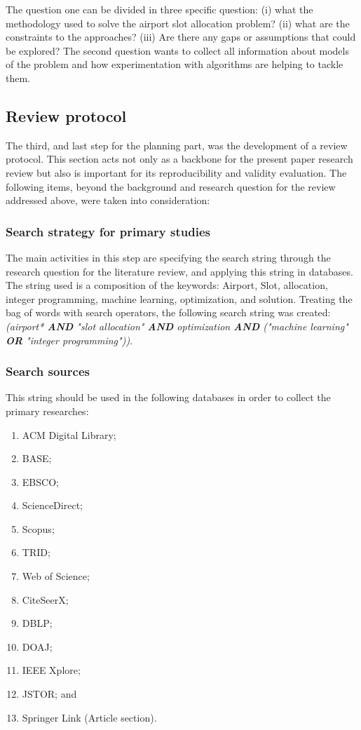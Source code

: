 The question one can be divided in three specific question: (i) what the methodology used to solve the airport slot allocation problem? (ii) what are the constraints to the approaches? (iii) Are there any gaps or assumptions that could be explored?
The second question wants to collect all information about models of the problem and how experimentation with algorithms are helping to tackle them.

\subsection{Review protocol}

The third, and last step for the planning part, was the development of a review protocol. This section acts not only as a backbone for the present paper research review but also is important for its reproducibility and validity evaluation. The following items, beyond the background and research question for the review addressed above, were taken into consideration:

\subsubsection{Search strategy for primary studies}

The main activities in this step are specifying the search string through the research question for the literature review, and applying this string in databases. The string used is a composition of the keywords: Airport, Slot, allocation, integer programming, machine learning, optimization, and solution. Treating the bag of words with search operators, the following search string was created: 
\\

\textit{(airport* \textbf{AND} "slot allocation" \textbf{AND}
 optimization \textbf{AND} ("machine learning" \textbf{OR} "integer programming"))}. 
\\

\subsubsection{Search sources}

This string should be used in the following databases in order to collect the primary researches:
\begin{enumerate}
    \item ACM Digital Library;
    \item \acrfull{BASE};
    \item EBSCO;
    \item ScienceDirect;
    \item Scopus;
    \item \acrfull{TRID};
    \item Web of Science;
    \item CiteSeerX;
    \item \acrfull{DBLP};
    \item \acrfull{DOAJ};
    \item IEEE Xplore;
    \item JSTOR; and
    \item Springer Link (Article section).
\end{enumerate}


